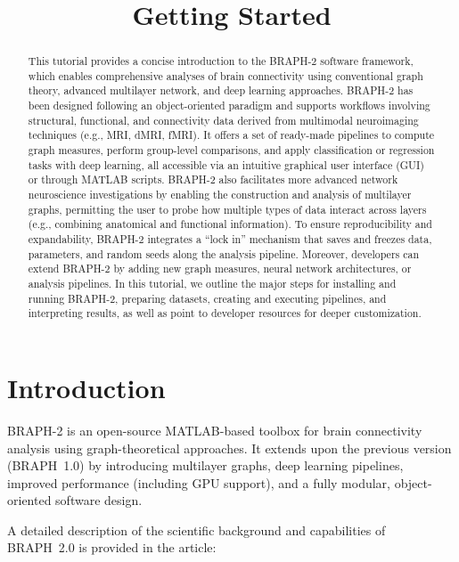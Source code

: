 \documentclass[justified]{tufte-handout}
\title{Getting Started}
\begin{document}
\maketitle

\begin{abstract}
\noindent
This tutorial provides a concise introduction to the BRAPH-2 software framework, which enables comprehensive analyses of brain connectivity using conventional graph theory, advanced multilayer network, and deep learning approaches. BRAPH-2 has been designed following an object-oriented paradigm and supports workflows involving structural, functional, and connectivity data derived from multimodal neuroimaging techniques (e.g., MRI, dMRI, fMRI). It offers a set of ready-made pipelines to compute graph measures, perform group-level comparisons, and apply classification or regression tasks with deep learning, all accessible via an intuitive graphical user interface (GUI) or through MATLAB scripts. BRAPH-2 also facilitates more advanced network neuroscience investigations by enabling the construction and analysis of multilayer graphs, permitting the user to probe how multiple types of data interact across layers (e.g., combining anatomical and functional information). To ensure reproducibility and expandability, BRAPH-2 integrates a ``lock in'' mechanism that saves and freezes data, parameters, and random seeds along the analysis pipeline. Moreover, developers can extend BRAPH-2 by adding new graph measures, neural network architectures, or analysis pipelines. In this tutorial, we outline the major steps for installing and running BRAPH-2, preparing datasets, creating and executing pipelines, and interpreting results, as well as point to developer resources for deeper customization.
\end{abstract}

\tableofcontents

\clearpage

\section{Introduction}

BRAPH-2 is an open-source MATLAB-based toolbox for brain connectivity analysis using graph-theoretical approaches. 
It extends upon the previous version (BRAPH~1.0) by introducing multilayer graphs, deep learning pipelines, improved performance (including GPU support), and a fully modular, object-oriented software design.

A detailed description of the scientific background and capabilities of BRAPH~2.0 is provided in the article:
\end{document}
